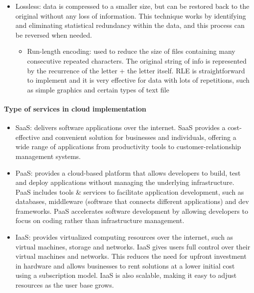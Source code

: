 \documentclass[a4paper,12pt]{article}
\begin{document}
\begin{itemize}
\begin{itemize}
\begin{enumerate}
\begin{enumerate}
\item Zigzag scan
\item RLE
\item Huffman coding
\end{enumerate}
\end{enumerate}
\end{itemize}
\item Lossless: data is compressed to a smaller size, but can be restored back to the original without any loss of information. This technique works by identifying and eliminating statistical redundancy within the data, and this process can be reversed when needed. 
	\begin{itemize}
		\item Run-length encoding: used to reduce the
size of files containing many consecutive repeated characters. The original string of info is represented by the recurrence of the letter + the letter itself. RLE is straightforward to implement and it is very effective for data with lots of repetitions, such as simple graphics and certain types of text file
	\end{itemize}
\end{itemize}
\paragraph{Type of services in cloud implementation}
\begin{itemize}
\item SaaS: delivers software applications over the internet. SaaS provides a cost-effective and convenient solution for businesses and individuals, offering a wide range of applications from productivity tools to customer-relationship management systems. 
\item PaaS: provides a cloud-based platform that allows developers to build, test and deploy applications without managing the underlying infrastructure. PaaS includes tools \& services to facilitate application development, such as databases, middleware (software that connects different applications) and dev frameworks. PaaS accelerates software development by allowing developers to focus on coding rather than infrastructure management.
\item IaaS: provides virtualized computing resources over the internet, such as virtual machines, storage and networks. IaaS gives users full control over their virtual machines and networks. This reduces the need for upfront investment in hardware and allows businesses to rent solutions at a lower initial cost using a subscription model. IaaS is also scalable, making it easy to adjust resources as the user base grows.
\end{itemize}
\end{document}
